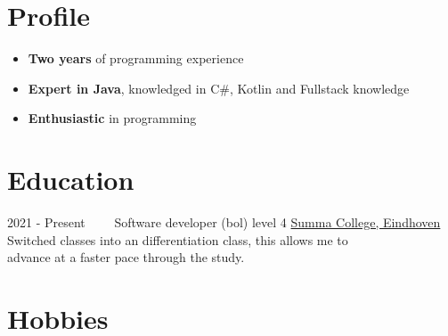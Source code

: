 \documentclass[letterpaper]{twentysecondcv} %
\begin{document}
    \makesidebarFirst %



    \section{Profile}

    \begin{itemize}
        \item \textbf{Two years} of programming experience
        \item \textbf{Expert in Java}, knowledged in C\#, Kotlin and Fullstack knowledge
        \item \textbf{Enthusiastic} in programming
    \end{itemize}

    \vspace{6mm}




    \section{Education}

    \begin{twenty} %
        \twentyitem
        {2021 -}
        {Present~~~~}
        {Software developer (bol) level 4}
        {\href{https://www.summacollege.nl/}{Summa College, Eindhoven}}
        {}
        {
            Switched classes into an differentiation class, this allows me to \\ advance at a faster pace through the study.
        }
    \end{twenty}



    \section{Hobbies}
\end{document}
